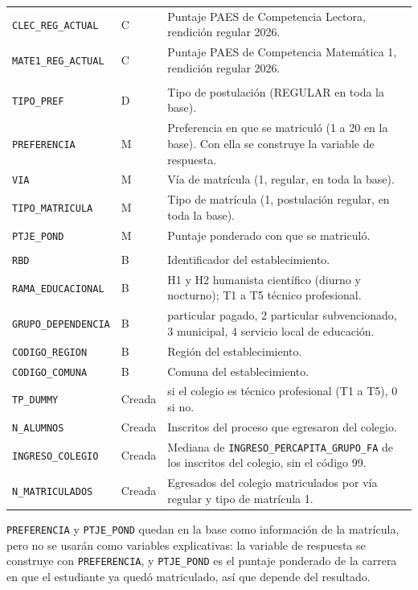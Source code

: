 \documentclass[11pt]{article}
\begin{document}
\begin{longtable}{>{\raggedright\arraybackslash}p{5.4cm}
                  >{\raggedright\arraybackslash}p{1.4cm}
                  >{\raggedright\arraybackslash}p{6.6cm}}
\texttt{CLEC\_REG\_ACTUAL} & C & Puntaje PAES de Competencia Lectora, rendición regular 2026. \\
\texttt{MATE1\_REG\_ACTUAL} & C & Puntaje PAES de Competencia Matemática 1, rendición regular 2026. \\
\midrule
\multicolumn{3}{l}{\textit{Postulación y matrícula}} \\
\texttt{TIPO\_PREF} & D & Tipo de postulación (REGULAR en toda la base). \\
\texttt{PREFERENCIA} & M & Preferencia en que se matriculó (1 a 20 en la base). Con ella se construye la variable de respuesta. \\
\texttt{VIA} & M & Vía de matrícula (1, regular, en toda la base). \\
\texttt{TIPO\_MATRICULA} & M & Tipo de matrícula (1, postulación regular, en toda la base). \\
\texttt{PTJE\_POND} & M & Puntaje ponderado con que se matriculó. \\
\midrule
\multicolumn{3}{l}{\textit{Colegio de egreso}} \\
\texttt{RBD} & B & Identificador del establecimiento. \\
\texttt{RAMA\_EDUCACIONAL} & B & H1 y H2 humanista científico (diurno y nocturno); T1 a T5 técnico profesional. \\
\texttt{GRUPO\_DEPENDENCIA} & B & 1 particular pagado, 2 particular subvencionado, 3 municipal, 4 servicio local de educación. \\
\texttt{CODIGO\_REGION} & B & Región del establecimiento. \\
\texttt{CODIGO\_COMUNA} & B & Comuna del establecimiento. \\
\texttt{TP\_DUMMY} & Creada & 1 si el colegio es técnico profesional (T1 a T5), 0 si no. \\
\texttt{N\_ALUMNOS} & Creada & Inscritos del proceso que egresaron del colegio. \\
\texttt{INGRESO\_COLEGIO} & Creada & Mediana de \texttt{INGRESO\_PERCAPITA\_GRUPO\_FA} de los inscritos del colegio, sin el código 99. \\
\texttt{N\_MATRICULADOS} & Creada & Egresados del colegio matriculados por vía regular y tipo de matrícula 1. \\
\end{longtable}

\texttt{PREFERENCIA} y \texttt{PTJE\_POND} quedan en la base como
información de la matrícula, pero no se usarán como variables
explicativas: la variable de respuesta se construye con
\texttt{PREFERENCIA}, y \texttt{PTJE\_POND} es el puntaje ponderado de
la carrera en que el estudiante ya quedó matriculado, así que depende
del resultado.
\end{document}
